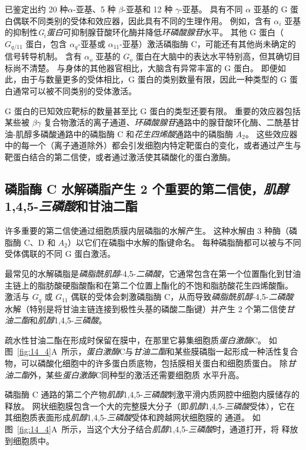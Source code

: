 已鉴定出约 20 种$\alpha$-亚基、5 种 $\beta$-亚基和 12 种 $\gamma$-亚基。
具有不同 $\alpha$ 亚基的 G 蛋白偶联不同类别的受体和效应器，因此具有不同的生理作用。
例如，含有 $\alpha _i$ 亚基的抑制性\textit{G$_i $蛋白}可抑制腺苷酸环化酶并降低\textit{环磷酸腺苷}水平。
其他 G 蛋白（$ G_{q/11} $ 蛋白，包含 $\alpha_q$-亚基或 $\alpha_{11}$-亚基）激活磷脂酶 C，可能还有其他尚未确定的信号转导机制。
含有 $\alpha_o$ 亚基的 $G_o$ 蛋白在大脑中的表达水平特别高，但其确切目标尚不清楚。
与身体的其他器官相比，大脑含有异常丰富的 G 蛋白。
即便如此，由于与数量更多的受体相比，G 蛋白的类别数量有限，因此一种类型的 G 蛋白通常可以被不同类别的受体激活。


G 蛋白的已知效应靶标的数量甚至比 G 蛋白的类型还要有限。
重要的效应器包括某些被 $\beta \gamma$ 复合物激活的离子通道、\textit{环磷酸腺苷}通路中的腺苷酸环化酶、二酰基甘油-肌醇多磷酸通路中的磷脂酶 C 和\textit{花生四烯酸}通路中的磷脂酶 $A_2$。
这些效应器中的每一个（离子通道除外）都会引发细胞内特定靶蛋白的变化，或者通过产生与靶蛋白结合的第二信使，或者通过激活使其磷酸化的蛋白激酶。



\subsection{磷脂酶 C 水解磷脂产生 2 个重要的第二信使，\textit{肌醇}1,4,5-\textit{三磷酸}和甘油二酯}

许多重要的第二信使通过细胞质膜内层磷脂的水解产生。
这种水解由 3 种酶（磷脂酶 C、D 和 $A_2$）以它们在磷脂中水解的酯键命名。
每种磷脂酶都可以被与不同受体偶联的不同 G 蛋白激活。


最常见的水解磷脂是\textit{磷脂酰肌醇}-4,5-\textit{二磷酸}，它通常包含在第一个位置酯化到甘油主链上的脂肪酸硬脂酸酯和在第二个位置上酯化的不饱和脂肪酸花生四烯酸酯。
激活与 $ G_q $ 或 $ G_{11} $ 偶联的受体会刺激磷脂酶 C，从而导致\textit{磷脂酰肌醇}-4,5-\textit{二磷酸}水解（特别是将甘油主链连接到极性头基的磷酸二酯键）并产生 2 个第二信使\textit{甘油二酯}和\textit{肌醇}1,4,5-\textit{三磷酸}。


疏水性甘油二酯在形成时保留在膜中，在那里它募集细胞质\textit{蛋白激酶}C。
如图~\ref{fig:14_4}A~所示，\textit{蛋白激酶}C与\textit{甘油二酯}和某些膜磷脂一起形成一种活性复合物，可以磷酸化细胞中的许多蛋白质底物，包括膜相关蛋白和细胞质蛋白。
除\textit{甘油二酯}外，某些\textit{蛋白激酶}C同种型的激活还需要细胞质  水平升高。


磷脂酶 C 通路的第二个产物\textit{肌醇}1,4,5-\textit{三磷酸}刺激平滑内质网腔中细胞内膜储存的  释放。
网状细胞膜包含一个大的完整膜大分子（即\textit{肌醇}1,4,5-\textit{三磷酸}受体），它在其细胞质表面形成\textit{肌醇}1,4,5-\textit{三磷酸}受体和跨越网状细胞膜的  通道。
如图~\ref{fig:14_4}A~所示，当这个大分子结合\textit{肌醇}1,4,5-\textit{三磷酸}时，通道打开，将  释放到细胞质中。


